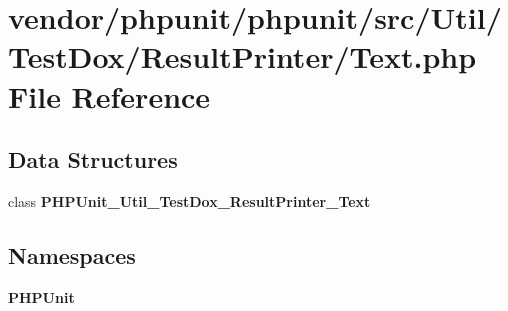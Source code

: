\section{vendor/phpunit/phpunit/src/\+Util/\+Test\+Dox/\+Result\+Printer/\+Text.php File Reference}
\label{phpunit_2src_2_util_2_test_dox_2_result_printer_2_text_8php}
\subsection*{Data Structures}
\begin{DoxyCompactItemize}
\item 
class {\bf P\+H\+P\+Unit\+\_\+\+Util\+\_\+\+Test\+Dox\+\_\+\+Result\+Printer\+\_\+\+Text}
\end{DoxyCompactItemize}
\subsection*{Namespaces}
\begin{DoxyCompactItemize}
\item 
 {\bf P\+H\+P\+Unit}
\end{DoxyCompactItemize}
